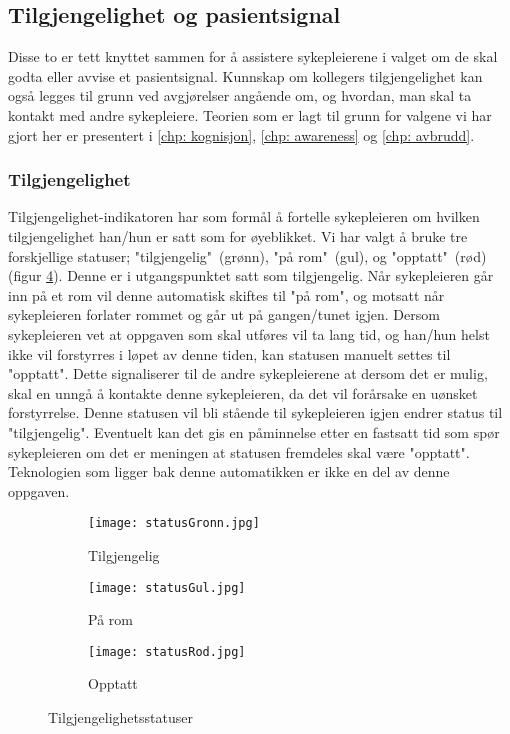 \subsection{Tilgjengelighet og pasientsignal}
Disse to er tett knyttet sammen for å assistere sykepleierene i valget om de skal godta eller avvise et pasientsignal. Kunnskap om kollegers tilgjengelighet kan også legges til grunn ved avgjørelser angående om, og hvordan, man skal ta kontakt med andre sykepleiere. Teorien som er lagt til grunn for valgene vi har gjort her er presentert i \ref{chp: kognisjon}, \ref{chp: awareness} og \ref{chp: avbrudd}.

\subsubsection{Tilgjengelighet}
Tilgjengelighet-indikatoren har som formål å fortelle sykepleieren om hvilken tilgjengelighet han/hun er satt som for øyeblikket. Vi har valgt å bruke tre forskjellige statuser; "tilgjengelig"\ (grønn), "på rom"\ (gul), og "opptatt"\ (rød) (figur \ref{tilgjengelighetsstatuser}). Denne er i utgangspunktet satt som tilgjengelig. Når sykepleieren går inn på et rom vil denne automatisk skiftes til "på rom", og motsatt når sykepleieren forlater rommet og går ut på gangen/tunet igjen. Dersom sykepleieren vet at oppgaven som skal utføres vil ta lang tid, og han/hun helst ikke vil forstyrres i løpet av denne tiden, kan statusen manuelt settes til "opptatt". Dette signaliserer til de andre sykepleierene at dersom det er mulig, skal en unngå å kontakte denne sykepleieren, da det vil forårsake en uønsket forstyrrelse. Denne statusen vil bli stående til sykepleieren igjen endrer status til "tilgjengelig". Eventuelt kan det gis en påminnelse etter en fastsatt tid som spør sykepleieren om det er meningen at statusen fremdeles skal være "opptatt". Teknologien som ligger bak denne automatikken er ikke en del av denne oppgaven.

\begin{figure}
	\centering
	\begin{subfigure}[b]{0.3\textwidth}
		\texttt{[image: statusGronn.jpg]}
		\caption{Tilgjengelig}
		\label{proto_startside}
	\end{subfigure}
	\begin{subfigure}[b]{0.3\textwidth}
		\texttt{[image: statusGul.jpg]}
		\caption{På rom}
		\label{proto_startside}
	\end{subfigure}
	\begin{subfigure}[b]{0.3\textwidth}
		\texttt{[image: statusRod.jpg]}
		\caption{Opptatt}
		\label{proto_startside_medMeny}
	\end{subfigure}
	\caption{Tilgjengelighetsstatuser}
	\label{tilgjengelighetsstatuser}
\end{figure}


